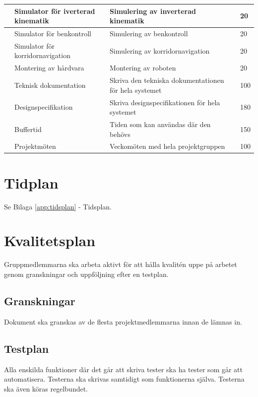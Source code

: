 \documentclass[a4paper,titlepage,12pt]{article}
\newcounter{aktNr}
\newcommand{\nextAktNr}{\stepcounter{aktNr}\arabic{aktNr}}
\begin{document}
\begin{longtable}[c]{ c p{4cm} p{6cm} p{2cm} p{2cm}}
		\nextAktNr{} & Simulator för iverterad kinematik & Simulering av inverterad kinematik &  & 20 \\ \midrule
		\nextAktNr{} & Simulator för benkontroll & Simulering av benkontroll &  & 20 \\ \midrule
		\nextAktNr{} & Simulator för korridornavigation & Simulering av korridornavigation &  & 20 \\ \midrule
		\nextAktNr{} & Montering av hårdvara & Montering av roboten &  & 20 \\ \midrule
		\nextAktNr{} & Teknisk dokumentation & Skriva den tekniska dokumentationen för hela
                                                            systemet &  & 100 \\ \midrule
		\nextAktNr{} & Designspecifikation & Skriva designspecifikationen för hela systemet &  & 180 \\ \midrule
		\nextAktNr{} & Buffertid & Tiden som kan användas där den behövs &  & 150 \\ \midrule
		\nextAktNr{} & Projektmöten & Veckomöten med hela projektgruppen &  & 100 \\ \midrule
	\end{longtable}

	
	\section{Tidplan}
    Se Bilaga \ref{app:tidsplan} - Tidsplan.
	
	\section{Kvalitetsplan}
	Gruppmedlemmarna ska arbeta aktivt för att hålla kvalitén uppe på arbetet genom 
	granskningar och uppföljning efter en testplan.
	
	\subsection{Granskningar}
	Dokument ska granskas av de flesta projektmedlemmarna innan de lämnas in.
	
	\subsection{Testplan}
	Alla enskilda funktioner där det går att skriva tester ska ha tester som går att
	automatisera. Testerna ska skrivas samtidigt som funktionerna själva. Testerna ska
	även köras regelbundet. 
\end{document}

